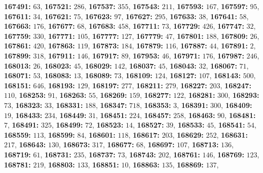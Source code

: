 \textsf{\bfseries 167491:} $63$, \textsf{\bfseries 167521:} $286$, \textsf{\bfseries 167537:} $355$, \textsf{\bfseries 167543:} $211$, \textsf{\bfseries 167593:} $167$, \textsf{\bfseries 167597:} $95$, \textsf{\bfseries 167611:} $34$, \textsf{\bfseries 167621:} $75$, \textsf{\bfseries 167623:} $97$, \textsf{\bfseries 167627:} $295$, \textsf{\bfseries 167633:} $38$, \textsf{\bfseries 167641:} $58$, \textsf{\bfseries 167663:} $176$, \textsf{\bfseries 167677:} $68$, \textsf{\bfseries 167683:} $458$, \textsf{\bfseries 167711:} $73$, \textsf{\bfseries 167729:} $426$, \textsf{\bfseries 167747:} $32$, \textsf{\bfseries 167759:} $330$, \textsf{\bfseries 167771:} $105$, \textsf{\bfseries 167777:} $127$, \textsf{\bfseries 167779:} $47$, \textsf{\bfseries 167801:} $188$, \textsf{\bfseries 167809:} $26$, \textsf{\bfseries 167861:} $420$, \textsf{\bfseries 167863:} $119$, \textsf{\bfseries 167873:} $184$, \textsf{\bfseries 167879:} $116$, \textsf{\bfseries 167887:} $44$, \textsf{\bfseries 167891:} $2$, \textsf{\bfseries 167899:} $318$, \textsf{\bfseries 167911:} $146$, \textsf{\bfseries 167917:} $89$, \textsf{\bfseries 167953:} $46$, \textsf{\bfseries 167971:} $176$, \textsf{\bfseries 167987:} $246$, \textsf{\bfseries 168013:} $26$, \textsf{\bfseries 168023:} $45$, \textsf{\bfseries 168029:} $142$, \textsf{\bfseries 168037:} $45$, \textsf{\bfseries 168043:} $32$, \textsf{\bfseries 168067:} $71$, \textsf{\bfseries 168071:} $53$, \textsf{\bfseries 168083:} $13$, \textsf{\bfseries 168089:} $73$, \textsf{\bfseries 168109:} $124$, \textsf{\bfseries 168127:} $107$, \textsf{\bfseries 168143:} $500$, \textsf{\bfseries 168151:} $646$, \textsf{\bfseries 168193:} $129$, \textsf{\bfseries 168197:} $277$, \textsf{\bfseries 168211:} $279$, \textsf{\bfseries 168227:} $203$, \textsf{\bfseries 168247:} $110$, \textsf{\bfseries 168253:} $91$, \textsf{\bfseries 168263:} $55$, \textsf{\bfseries 168269:} $159$, \textsf{\bfseries 168277:} $122$, \textsf{\bfseries 168281:} $300$, \textsf{\bfseries 168293:} $73$, \textsf{\bfseries 168323:} $33$, \textsf{\bfseries 168331:} $188$, \textsf{\bfseries 168347:} $718$, \textsf{\bfseries 168353:} $3$, \textsf{\bfseries 168391:} $300$, \textsf{\bfseries 168409:} $19$, \textsf{\bfseries 168433:} $234$, \textsf{\bfseries 168449:} $31$, \textsf{\bfseries 168451:} $224$, \textsf{\bfseries 168457:} $258$, \textsf{\bfseries 168463:} $90$, \textsf{\bfseries 168481:} $7$, \textsf{\bfseries 168491:} $325$, \textsf{\bfseries 168499:} $72$, \textsf{\bfseries 168523:} $14$, \textsf{\bfseries 168527:} $39$, \textsf{\bfseries 168533:} $45$, \textsf{\bfseries 168541:} $54$, \textsf{\bfseries 168559:} $113$, \textsf{\bfseries 168599:} $84$, \textsf{\bfseries 168601:} $118$, \textsf{\bfseries 168617:} $203$, \textsf{\bfseries 168629:} $252$, \textsf{\bfseries 168631:} $217$, \textsf{\bfseries 168643:} $130$, \textsf{\bfseries 168673:} $317$, \textsf{\bfseries 168677:} $68$, \textsf{\bfseries 168697:} $107$, \textsf{\bfseries 168713:} $136$, \textsf{\bfseries 168719:} $61$, \textsf{\bfseries 168731:} $235$, \textsf{\bfseries 168737:} $73$, \textsf{\bfseries 168743:} $202$, \textsf{\bfseries 168761:} $146$, \textsf{\bfseries 168769:} $123$, \textsf{\bfseries 168781:} $219$, \textsf{\bfseries 168803:} $133$, \textsf{\bfseries 168851:} $10$, \textsf{\bfseries 168863:} $135$, \textsf{\bfseries 168869:} $137$, 
